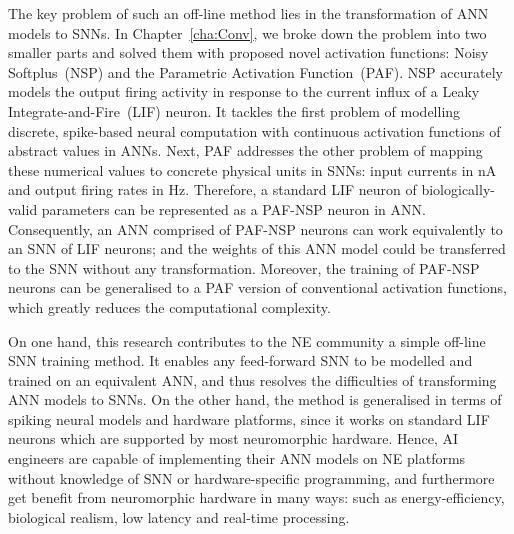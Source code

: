 The key problem of such an off-line method lies in the transformation of ANN models to SNNs.
In Chapter~\ref{cha:Conv}, we broke down the problem into two smaller parts and solved them with proposed novel activation functions: Noisy Softplus~(NSP) and the Parametric Activation Function~(PAF).
NSP accurately models the output firing activity in response to the current influx of a Leaky Integrate-and-Fire~(LIF) neuron.
It tackles the first problem of modelling discrete, spike-based neural computation with continuous activation functions of abstract values in ANNs.
Next, PAF addresses the other problem of mapping these numerical values to concrete physical units in SNNs: input currents in nA and output firing rates in Hz.
Therefore, a standard LIF neuron of biologically-valid parameters can be represented as a PAF-NSP neuron in ANN.
Consequently, an ANN comprised of PAF-NSP neurons can work equivalently to an SNN of LIF neurons; and the weights of this ANN model could be transferred to the SNN without any transformation.
Moreover, the training of PAF-NSP neurons can be generalised to a PAF version of conventional activation functions, which greatly reduces the computational complexity.


On one hand, this research contributes to the NE community a simple off-line SNN training method.
It enables any feed-forward SNN to be modelled and trained on an equivalent ANN, and thus resolves the difficulties of transforming ANN models to SNNs.
On the other hand, the method is generalised in terms of spiking neural models and hardware platforms, since it works on standard LIF neurons which are supported by most neuromorphic hardware.
Hence, AI engineers are capable of implementing their ANN models on NE platforms without knowledge of SNN or hardware-specific programming, and furthermore get benefit from neuromorphic hardware in many ways: such as energy-efficiency, biological realism, low latency and real-time processing.


